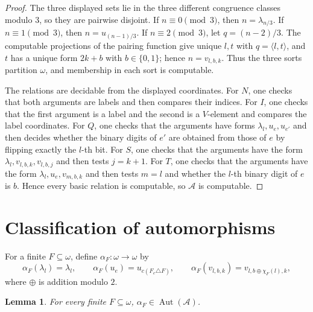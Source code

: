 \documentclass[12pt]{article}
\newtheorem{lemma}[theorem]{Lemma}
\theoremstyle{definition}
\theoremstyle{remark}
\newcommand{\Aut}{\operatorname{Aut}}
\begin{document}
\begin{proof}
The three displayed sets lie in the three different congruence classes modulo \(3\), so they are pairwise disjoint.  If \(n\equiv 0\pmod 3\), then \(n=\lambda_{n/3}\).  If \(n\equiv 1\pmod 3\), then \(n=u_{(n-1)/3}\).  If \(n\equiv 2\pmod 3\), let \(q=(n-2)/3\).  The computable projections of the pairing function give unique \(l,t\) with \(q=\langle l,t\rangle\), and \(t\) has a unique form \(2k+b\) with \(b\in\{0,1\}\); hence \(n=v_{l,b,k}\).  Thus the three sorts partition \(\omega\), and membership in each sort is computable.

The relations are decidable from the displayed coordinates.  For \(N\), one checks that both arguments are labels and then compares their indices.  For \(I\), one checks that the first argument is a label and the second is a \(V\)-element and compares the label coordinates.  For \(Q\), one checks that the arguments have forms \(\lambda_l,u_e,u_{e'}\) and then decides whether the binary digits of \(e'\) are obtained from those of \(e\) by flipping exactly the \(l\)-th bit.  For \(S\), one checks that the arguments have the form \(\lambda_l,v_{l,b,k},v_{l,b,j}\) and then tests \(j=k+1\).  For \(T\), one checks that the arguments have the form \(\lambda_l,u_e,v_{m,b,k}\) and then tests \(m=l\) and whether the \(l\)-th binary digit of \(e\) is \(b\).  Hence every basic relation is computable, so \(\mathcal A\) is computable.
\end{proof}

\section{Classification of automorphisms}\label{sec:automorphisms}

For a finite \(F\subseteq\omega\), define \(\alpha_F:\omega\to\omega\) by
\[
\alpha_F(\lambda_l)=\lambda_l,\qquad
\alpha_F(u_e)=u_{c(F_e\triangle F)},\qquad
\alpha_F(v_{l,b,k})=v_{l,b\oplus\chi_F(l),k},
\]
where \(\oplus\) is addition modulo \(2\).

\begin{lemma}\label{lem:alpha-auto}
For every finite \(F\subseteq\omega\), \(\alpha_F\in\Aut(\mathcal A)\).
\end{lemma}
\end{document}
